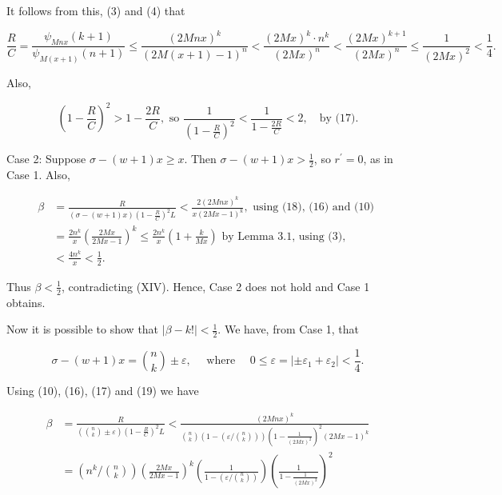 \documentclass[10pt,letterpaper]{article}
\begin{document}
It follows from this, (3) and (4) that


\begin{equation*}
\frac{R}{C}=\frac{\psi_{M n x}(k+1)}{\psi_{M(x+1)}(n+1)} \leq \frac{(2 M n x)^{k}}{(2 M(x+1)-1)^{n}}<\frac{(2 M x)^{k} \cdot n^{k}}{(2 M x)^{n}}<\frac{(2 M x)^{k+1}}{(2 M x)^{n}} \leq \frac{1}{(2 M x)^{2}}<\frac{1}{4} . \tag{17}
\end{equation*}


Also,


\begin{equation*}
\left(1-\frac{R}{C}\right)^{2}>1-\frac{2 R}{C}, \text { so } \frac{1}{\left(1-\frac{R}{C}\right)^{2}}<\frac{1}{1-\frac{2 R}{C}}<2,\quad\text{by (17)}.\tag{18}
\end{equation*}


Case 2: Suppose $\sigma-(w+1) x \geq x$. Then $\sigma-(w+1) x>\frac{1}{2}$, so $r^{\prime}=0$, as in Case 1. Also,

\[
\begin{aligned}
\beta & =\frac{R}{(\sigma-(w+1) x)\left(1-\frac{R}{C}\right)^{2} L}<\frac{2(2 M n x)^{k}}{x(2 M x-1)^{k}}, \text { using (18), (16) and (10) } \\
& =\frac{2 n^{k}}{x}\left(\frac{2 M x}{2 M x-1}\right)^{k} \leq \frac{2 n^{k}}{x}\left(1+\frac{k}{M x}\right) \text { by Lemma 3.1, using (3), } \\
& <\frac{4 n^{k}}{x}<\frac{1}{2} .
\end{aligned}
\]

Thus $\beta<\frac{1}{2}$, contradicting (XIV). Hence, Case 2 does not hold and Case 1 obtains.

Now it is possible to show that $|\beta-k!|<\frac{1}{2}$. We have, from Case 1, that


\begin{equation*}
\sigma-(w+1) x=\binom{n}{k} \pm \varepsilon, \quad \text { where } \quad 0 \leq \varepsilon=\left| \pm \varepsilon_{1}+\varepsilon_{2}\right|<\frac{1}{4} . \tag{19}
\end{equation*}


Using (10), (16), (17) and (19) we have

\[
\begin{aligned}
\beta & =\frac{R}{\left(\binom{n}{k} \pm \varepsilon\right)\left(1-\frac{R}{C}\right)^{2} L}<\frac{(2 M n x)^{k}}{\binom{n}{k}\left(1-\left(\varepsilon /\binom{n}{k}\right)\right)\left(1-\frac{1}{(2 M x)^{2}}\right)^{2}(2 M x-1)^{k}} \\
& =\left(n^{k} /\binom{n}{k}\right)\left(\frac{2 M x}{2 M x-1}\right)^{k}\left(\frac{1}{1-\left(\varepsilon /\binom{n}{k}\right)}\right)\left(\frac{1}{1-\frac{1}{(2 M x)^{2}}}\right)^{2}
\end{aligned}
\]
\end{document}
